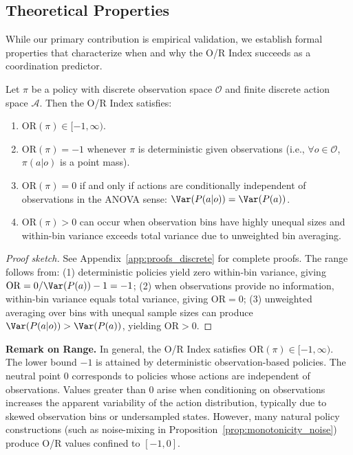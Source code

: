 
\subsection{Theoretical Properties}
\label{subsec:theory_properties}

While our primary contribution is empirical validation, we establish formal properties that characterize when and why the O/R Index succeeds as a coordination predictor.

\begin{proposition}
\label{prop:range_extremes}
Let $\pi$ be a policy with discrete observation space $\mathcal{O}$ and finite discrete action space $\mathcal{A}$. Then the O/R Index satisfies:
\begin{enumerate}
    \item $\mathrm{OR}(\pi) \in [-1, \infty)$.
    \item $\mathrm{OR}(\pi) = -1$ whenever $\pi$ is deterministic given observations (i.e., $\forall o \in \mathcal{O}$, $\pi(a|o)$ is a point mass).
    \item $\mathrm{OR}(\pi) = 0$ if and only if actions are conditionally independent of observations in the ANOVA sense: $\Var(P(a|o)) = \Var(P(a))$.
    \item $\mathrm{OR}(\pi) > 0$ can occur when observation bins have highly unequal sizes and within-bin variance exceeds total variance due to unweighted bin averaging.
\end{enumerate}
\end{proposition}

\begin{proof}[Proof sketch]
See Appendix~\ref{app:proofs_discrete} for complete proofs. The range follows from: (1) deterministic policies yield zero within-bin variance, giving $\mathrm{OR} = 0/\Var(P(a)) - 1 = -1$; (2) when observations provide no information, within-bin variance equals total variance, giving $\mathrm{OR} = 0$; (3) unweighted averaging over bins with unequal sample sizes can produce $\Var(P(a|o)) > \Var(P(a))$, yielding $\mathrm{OR} > 0$.
\end{proof}

\textbf{Remark on Range.} In general, the O/R Index satisfies $\mathrm{OR}(\pi) \in [-1, \infty)$. The lower bound $-1$ is attained by deterministic observation-based policies. The neutral point $0$ corresponds to policies whose actions are independent of observations. Values greater than $0$ arise when conditioning on observations increases the apparent variability of the action distribution, typically due to skewed observation bins or undersampled states. However, many natural policy constructions (such as noise-mixing in Proposition~\ref{prop:monotonicity_noise}) produce O/R values confined to $[-1, 0]$.


